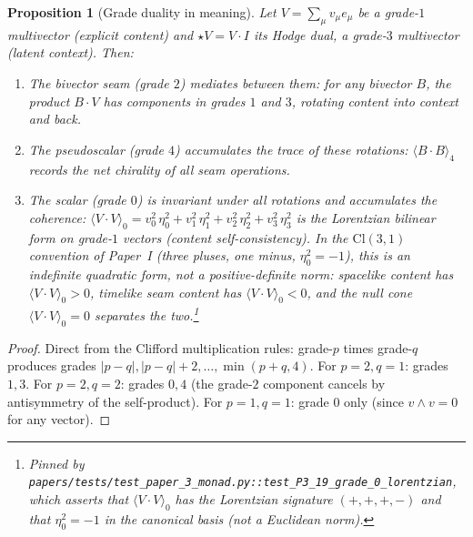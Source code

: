 \documentclass[11pt,a4paper]{article}
\theoremstyle{plain}
\newtheorem{proposition}[theorem]{Proposition}
\theoremstyle{definition}
\theoremstyle{remark}
\numberwithin{equation}{section}
\providecommand{\Cl}{\mathrm{Cl}}
\begin{document}
\begin{proposition}[Grade duality in meaning]
\label{prop:grade-duality}
Let $V = \sum_\mu v_\mu e_\mu$ be a grade-$1$ multivector
(explicit content) and $\star V = V \cdot I$ its Hodge dual,
a grade-$3$ multivector (latent context).  Then:
\begin{enumerate}[label=\textnormal{(\roman*)}]
  \item The bivector seam (grade $2$) mediates between them: for
    any bivector $B$, the product $B \cdot V$ has components in
    grades $1$ and $3$, rotating content into context and back.
  \item The pseudoscalar (grade $4$) accumulates the trace of
    these rotations: $\langle B \cdot B \rangle_4$ records the
    net chirality of all seam operations.
  \item The scalar (grade $0$) is invariant under all rotations
    and accumulates the coherence:
    $\langle V \cdot V \rangle_0 = v_0^2\,\eta_0^2 + v_1^2\,\eta_1^2
    + v_2^2\,\eta_2^2 + v_3^2\,\eta_3^2$ is the \emph{Lorentzian
    bilinear form} on grade-$1$ vectors (content
    self-consistency).  In the $\Cl(3,1)$ convention of
    Paper~I (three pluses, one minus, $\eta_0^2 = -1$), this is an
    \emph{indefinite} quadratic form, not a positive-definite norm:
    spacelike content has $\langle V\cdot V\rangle_0 > 0$, timelike
    seam content has $\langle V\cdot V\rangle_0 < 0$, and the
    null cone $\langle V \cdot V\rangle_0 = 0$ separates the
    two.\footnote{Pinned by
    \texttt{papers/tests/test\_paper\_3\_monad.py::test\_P3\_19\_grade\_0\_lorentzian},
    which asserts that $\langle V\cdot V\rangle_0$ has the
    Lorentzian signature $(+,+,+,-)$ and that $\eta_0^2 = -1$ in
    the canonical basis (\emph{not} a Euclidean norm).}
\end{enumerate}
\end{proposition}

\begin{proof}
Direct from the Clifford multiplication rules: grade-$p$ times
grade-$q$ produces grades $|p-q|, |p-q|+2, \ldots, \min(p+q, 4)$.
For $p = 2, q = 1$: grades $1, 3$.  For $p = 2, q = 2$: grades
$0, 4$ (the grade-$2$ component cancels by antisymmetry of the
self-product).  For $p = 1, q = 1$: grade $0$ only (since
$v \wedge v = 0$ for any vector).
\end{proof}
\end{document}
